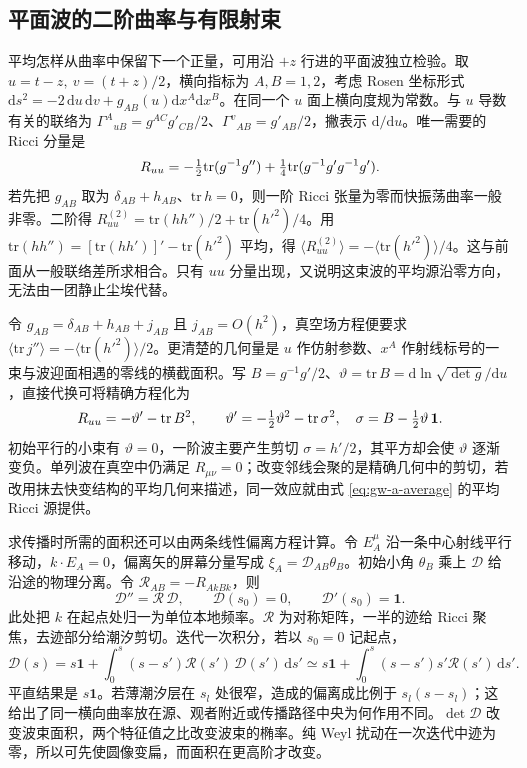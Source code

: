 \subsection{平面波的二阶曲率与有限射束}

平均怎样从曲率中保留下一个正量，可用沿 $+z$ 行进的平面波独立检验。取 $u=t-z,\ v=(t+z)/2$，横向指标为 $A,B=1,2$，考虑 Rosen 坐标形式 $\mathrm ds^2=-2\,\mathrm du\,\mathrm dv+g_{AB}(u)\mathrm dx^A\mathrm dx^B$。在同一个 $u$ 面上横向度规为常数。与 $u$ 导数有关的联络为 $\Gamma^A{}_{uB}=g^{AC}g'_{CB}/2$、$\Gamma^v{}_{AB}=g'_{AB}/2$，撇表示 $\mathrm d/\mathrm du$。唯一需要的 Ricci 分量是
\[
 R_{uu}=-\tfrac12{\rm tr}(g^{-1}g'')+\tfrac14{\rm tr}(g^{-1}g'g^{-1}g') .
\]
若先把 $g_{AB}$ 取为 $\delta_{AB}+h_{AB}$、$\mathrm{tr}\,h=0$，则一阶 Ricci 张量为零而快振荡曲率一般非零。二阶得 $R_{uu}^{(2)}=\mathrm{tr}(hh'')/2+\mathrm{tr}(h'^2)/4$。用 $\mathrm{tr}(hh'')=[\mathrm{tr}(hh')]'-\mathrm{tr}(h'^2)$ 平均，得 $\langle R_{uu}^{(2)}\rangle=-\langle\mathrm{tr}(h'^2)\rangle/4$。这与前面从一般联络差所求相合。只有 $uu$ 分量出现，又说明这束波的平均源沿零方向，无法由一团静止尘埃代替。

令 $g_{AB}=\delta_{AB}+h_{AB}+j_{AB}$ 且 $j_{AB}=O(h^2)$，真空场方程便要求 $\langle \mathrm{tr}\,j''\rangle=-\langle\mathrm{tr}(h'^2)\rangle/2$。更清楚的几何量是 $u$ 作仿射参数、$x^A$ 作射线标号的一束与波迎面相遇的零线的横截面积。写 $B=g^{-1}g'/2$、$\vartheta=\mathrm{tr}\,B=\mathrm d\ln\sqrt{\det g}/\mathrm du$，直接代换可将精确方程化为
\[
 R_{uu}=-\vartheta'-{\rm tr}\,B^2,\qquad
 \vartheta'=-\tfrac12\vartheta^2-{\rm tr}\,\sigma^2,\quad
 \sigma=B-\tfrac12\vartheta\,\mathbf1 .
\]
初始平行的小束有 $\vartheta=0$，一阶波主要产生剪切 $\sigma=h'/2$，其平方却会使 $\vartheta$ 逐渐变负。单列波在真空中仍满足 $R_{\mu\nu}=0$；改变邻线会聚的是精确几何中的剪切，若改用抹去快变结构的平均几何来描述，同一效应就由式 \eqref{eq:gw-a-average} 的平均 Ricci 源提供。

求传播时所需的面积还可以由两条线性偏离方程计算。令 $E_A^\mu$ 沿一条中心射线平行移动，$k\cdot E_A=0$，偏离矢的屏幕分量写成 $\xi_A=\mathcal D_{AB}\theta_B$。初始小角 $\theta_B$ 乘上 $\mathcal D$ 给沿途的物理分离。令 $\mathcal R_{AB}=-R_{A k B k}$，则
\[
 \mathcal D''=\mathcal R\,\mathcal D,\qquad
 \mathcal D(s_0)=0,\qquad \mathcal D'(s_0)=\mathbf1 .
\]
此处把 $k$ 在起点处归一为单位本地频率。$\mathcal R$ 为对称矩阵，一半的迹给 Ricci 聚焦，去迹部分给潮汐剪切。迭代一次积分，若以 $s_0=0$ 记起点，
\[
 \mathcal D(s)=s\mathbf1+\int_0^s(s-s')\mathcal R(s')\,\mathcal D(s')\,\mathrm ds'
   \simeq s\mathbf1+\int_0^s(s-s')s'\mathcal R(s')\,\mathrm ds' .
\]
平直结果是 $s\mathbf1$。若薄潮汐层在 $s_l$ 处很窄，造成的偏离成比例于 $s_l(s-s_l)$；这给出了同一横向曲率放在源、观者附近或传播路径中央为何作用不同。$\det\mathcal D$ 改变波束面积，两个特征值之比改变波束的椭率。纯 Weyl 扰动在一次迭代中迹为零，所以可先使圆像变扁，而面积在更高阶才改变。

